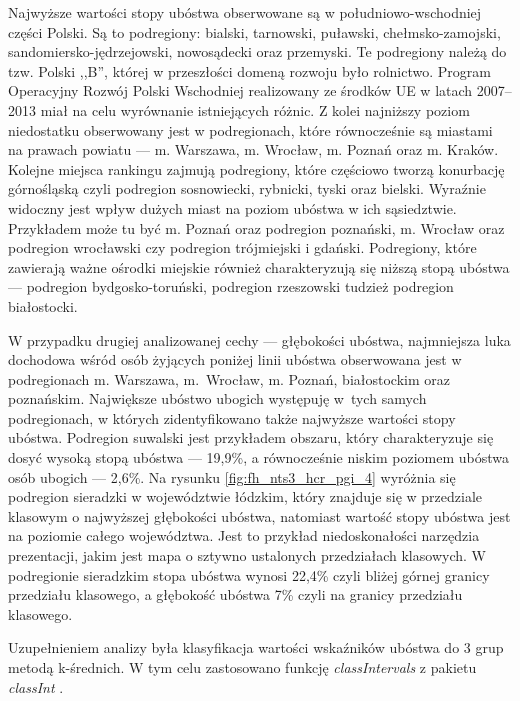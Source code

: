 Najwyższe wartości stopy ubóstwa obserwowane są w południowo-wschodniej części Polski. Są to podregiony: bialski, tarnowski, puławski, chełmsko-zamojski, sandomiersko-jędrzejowski, nowosądecki oraz przemyski. Te podregiony należą do tzw. Polski ,,B'', której w przeszłości domeną rozwoju było rolnictwo. Program Operacyjny Rozwój Polski Wschodniej realizowany ze środków UE w latach 2007--2013 miał na celu wyrównanie istniejących różnic. Z kolei najniższy poziom niedostatku obserwowany jest w podregionach, które równocześnie są miastami na prawach powiatu --- m. Warszawa, m. Wrocław, m. Poznań oraz m. Kraków. Kolejne miejsca rankingu zajmują podregiony, które częściowo tworzą konurbację górnośląską czyli podregion sosnowiecki, rybnicki, tyski oraz bielski. Wyraźnie widoczny jest wpływ dużych miast na poziom ubóstwa w ich sąsiedztwie. Przykładem może tu być m. Poznań oraz podregion poznański, m. Wrocław oraz podregion wrocławski czy podregion trójmiejski i gdański. Podregiony, które zawierają ważne ośrodki miejskie również charakteryzują się niższą stopą ubóstwa --- podregion bydgosko-toruński, podregion rzeszowski tudzież podregion białostocki.

W przypadku drugiej analizowanej cechy --- głębokości ubóstwa, najmniejsza luka dochodowa wśród osób żyjących poniżej linii ubóstwa obserwowana jest w podregionach m. Warszawa, m.~Wrocław, m. Poznań, białostockim oraz poznańskim. Największe ubóstwo ubogich występuję w~tych samych podregionach, w których zidentyfikowano także najwyższe wartości stopy ubóstwa. Podregion suwalski jest przykładem obszaru, który charakteryzuje się dosyć wysoką stopą ubóstwa --- 19,9\%, a równocześnie niskim poziomem ubóstwa osób ubogich --- 2,6\%. Na rysunku \ref{fig:fh_nts3_hcr_pgi_4} wyróżnia się podregion sieradzki w województwie łódzkim, który znajduje się w przedziale klasowym o najwyższej głębokości ubóstwa, natomiast wartość stopy ubóstwa jest na poziomie całego województwa. Jest to przykład niedoskonałości narzędzia prezentacji, jakim jest mapa o sztywno ustalonych przedziałach klasowych. W podregionie sieradzkim stopa ubóstwa wynosi 22,4\% czyli bliżej górnej granicy przedziału klasowego, a głębokość ubóstwa 7\% czyli na granicy przedziału klasowego.

Uzupełnieniem analizy była klasyfikacja wartości wskaźników ubóstwa do 3 grup metodą k-średnich. W tym celu zastosowano funkcję \textit{classIntervals} z pakietu \textit{classInt} \citep{classint2015}.


